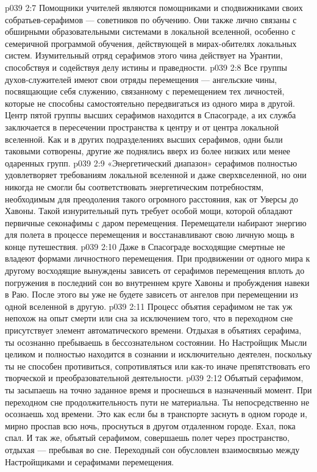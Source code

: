 \vs p039 2:7 \bibnobreakspace {} Помощники учителей являются помощниками и сподвижниками своих собратьев\hyp{}серафимов --- советников по обучению. Они также лично связаны с обширными образовательными системами в локальной вселенной, особенно с семеричной программой обучения, действующей в мирах\hyp{}обителях локальных систем. Изумительный отряд серафимов этого чина действует на Урантии, способствуя и содействуя делу истины и праведности.
\vs p039 2:8 \bibnobreakspace {} Все группы духов\hyp{}служителей имеют свои отряды перемещения --- ангельские чины, посвящающие себя служению, связанному с перемещением тех личностей, которые не способны самостоятельно передвигаться из одного мира в другой. Центр пятой группы высших серафимов находится в Спасограде, а их служба заключается в пересечении пространства к центру и от центра локальной вселенной. Как и в других подразделениях высших серафимов, одни были таковыми сотворены, другие же поднялись вверх из более низких или менее одаренных групп.
\vs p039 2:9 \pc «Энергетический диапазон» серафимов полностью удовлетворяет требованиям локальной вселенной и даже сверхвселенной, но они никогда не смогли бы соответствовать энергетическим потребностям, необходимым для преодоления такого огромного расстояния, как от Уверсы до Хавоны. Такой изнурительный путь требует особой мощи, которой обладают первичные секонафимы с даром перемещения. Перемещатели набирают энергию для полета в процессе перемещения и восстанавливают свою личную мощь в конце путешествия.
\vs p039 2:10 \pc Даже в Спасограде восходящие смертные не владеют формами личностного перемещения. При продвижении от одного мира к другому восходящие вынуждены зависеть от серафимов перемещения вплоть до погружения в последний сон во внутреннем круге Хавоны и пробуждения навеки в Раю. После этого вы уже не будете зависеть от ангелов при перемещении из одной вселенной в другую.
\vs p039 2:11 Процесс объятия серафимом не так уж непохож на опыт смерти или сна за исключением того, что в переходном сне присутствует элемент автоматического времени. Отдыхая в объятиях серафима, ты осознанно пребываешь в бессознательном состоянии. Но Настройщик Мысли целиком и полностью находится в сознании и исключительно деятелен, поскольку ты не способен противиться, сопротивляться или как\hyp{}то иначе препятствовать его творческой и преобразовательной деятельности.
\vs p039 2:12 Объятый серафимом, ты засыпаешь на точно заданное время и проснешься в назначенный момент. При переходном сне продолжительность пути не материальна. Ты непосредственно не осознаешь ход времени. Это как если бы в транспорте заснуть в одном городе и, мирно проспав всю ночь, проснуться в другом отдаленном городе. Ехал, пока спал. И так же, объятый серафимом, совершаешь полет через пространство, отдыхая --- пребывая во сне. Переходный сон обусловлен взаимосвязью между Настройщиками и серафимами перемещения.
